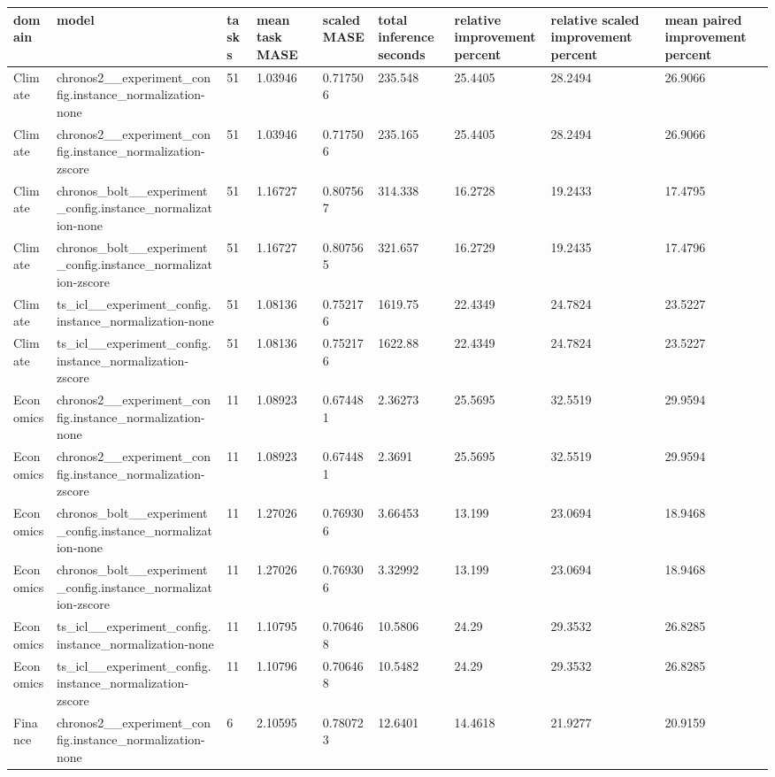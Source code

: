 \begin{tabular}{lllllllll}
\toprule
domain & model & tasks & mean task MASE & scaled MASE & total inference seconds & relative improvement percent & relative scaled improvement percent & mean paired improvement percent \\
\midrule
Climate & chronos2\_\_experiment\_config.instance\_normalization-none & 51 & 1.03946 & 0.717506 & 235.548 & 25.4405 & 28.2494 & 26.9066 \\
Climate & chronos2\_\_experiment\_config.instance\_normalization-zscore & 51 & 1.03946 & 0.717506 & 235.165 & 25.4405 & 28.2494 & 26.9066 \\
Climate & chronos\_bolt\_\_experiment\_config.instance\_normalization-none & 51 & 1.16727 & 0.807567 & 314.338 & 16.2728 & 19.2433 & 17.4795 \\
Climate & chronos\_bolt\_\_experiment\_config.instance\_normalization-zscore & 51 & 1.16727 & 0.807565 & 321.657 & 16.2729 & 19.2435 & 17.4796 \\
Climate & ts\_icl\_\_experiment\_config.instance\_normalization-none & 51 & 1.08136 & 0.752176 & 1619.75 & 22.4349 & 24.7824 & 23.5227 \\
Climate & ts\_icl\_\_experiment\_config.instance\_normalization-zscore & 51 & 1.08136 & 0.752176 & 1622.88 & 22.4349 & 24.7824 & 23.5227 \\
Economics & chronos2\_\_experiment\_config.instance\_normalization-none & 11 & 1.08923 & 0.674481 & 2.36273 & 25.5695 & 32.5519 & 29.9594 \\
Economics & chronos2\_\_experiment\_config.instance\_normalization-zscore & 11 & 1.08923 & 0.674481 & 2.3691 & 25.5695 & 32.5519 & 29.9594 \\
Economics & chronos\_bolt\_\_experiment\_config.instance\_normalization-none & 11 & 1.27026 & 0.769306 & 3.66453 & 13.199 & 23.0694 & 18.9468 \\
Economics & chronos\_bolt\_\_experiment\_config.instance\_normalization-zscore & 11 & 1.27026 & 0.769306 & 3.32992 & 13.199 & 23.0694 & 18.9468 \\
Economics & ts\_icl\_\_experiment\_config.instance\_normalization-none & 11 & 1.10795 & 0.706468 & 10.5806 & 24.29 & 29.3532 & 26.8285 \\
Economics & ts\_icl\_\_experiment\_config.instance\_normalization-zscore & 11 & 1.10796 & 0.706468 & 10.5482 & 24.29 & 29.3532 & 26.8285 \\
Finance & chronos2\_\_experiment\_config.instance\_normalization-none & 6 & 2.10595 & 0.780723 & 12.6401 & 14.4618 & 21.9277 & 20.9159 \\

\end{tabular}
